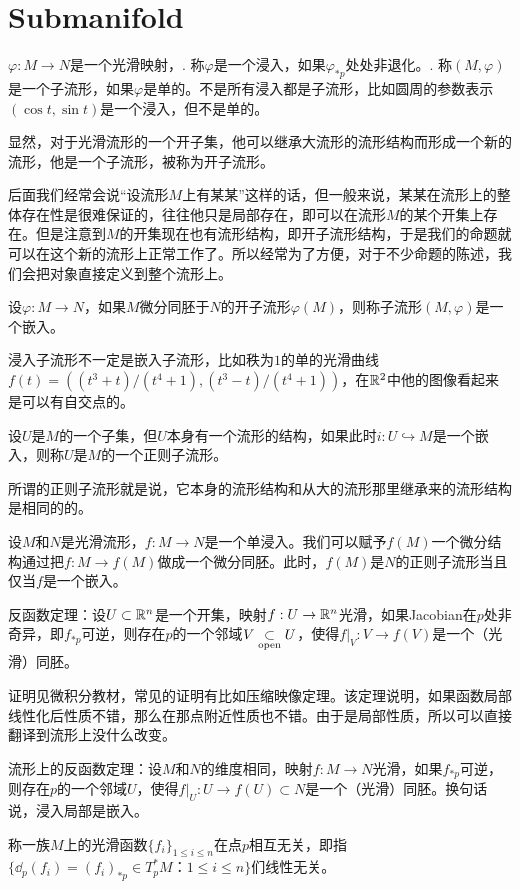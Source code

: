 \section{Submanifold}

\para $\varphi:M\to N$是一个光滑映射，. 称$\varphi$是一个浸入，如果$\varphi_{*p}$处处非退化。. 称$(M,\varphi)$是一个子流形，如果$\varphi$是单的。不是所有浸入都是子流形，比如圆周的参数表示$(\cos t,\sin t)$是一个浸入，但不是单的。

显然，对于光滑流形的一个开子集，他可以继承大流形的流形结构而形成一个新的流形，他是一个子流形，被称为开子流形。

后面我们经常会说“设流形$M$上有某某”这样的话，但一般来说，某某在流形上的整体存在性是很难保证的，往往他只是局部存在，即可以在流形$M$的某个开集上存在。但是注意到$M$的开集现在也有流形结构，即开子流形结构，于是我们的命题就可以在这个新的流形上正常工作了。所以经常为了方便，对于不少命题的陈述，我们会把对象直接定义到整个流形上。

\para 设$\varphi:M\to N$，如果$M$微分同胚于$N$的开子流形$\varphi(M)$，则称子流形$(M,\varphi)$是一个嵌入。

浸入子流形不一定是嵌入子流形，比如秩为$1$的单的光滑曲线$f(t)=((t^3+t)/(t^4+1),(t^3-t)/(t^4+1))$，在$\mathbb{R}^2$中他的图像看起来是可以有自交点的。

\para 设$U$是$M$的一个子集，但$U$本身有一个流形的结构，如果此时$i:U\hookrightarrow M$是一个嵌入，则称$U$是$M$的一个正则子流形。

所谓的正则子流形就是说，它本身的流形结构和从大的流形那里继承来的流形结构是相同的的。

\para 设$M$和$N$是光滑流形，$f:M\to N$是一个单浸入。我们可以赋予$f(M)$一个微分结构通过把$f:M\to f(M)$做成一个微分同胚。此时，$f(M)$是$N$的正则子流形当且仅当$f$是一个嵌入。

\para 反函数定理：设$U\subset \mathbb{R}^n$是一个开集，映射$f:U\to \mathbb{R}^n$光滑，如果Jacobian在$p$处非奇异，即$f_{*p}$可逆，则存在$p$的一个邻域$V\underset{\mathrm{open}}{\subset} U$，使得$f|_V:V\to f(V)$是一个（光滑）同胚。

证明见微积分教材，常见的证明有比如压缩映像定理。该定理说明，如果函数局部线性化后性质不错，那么在那点附近性质也不错。由于是局部性质，所以可以直接翻译到流形上没什么改变。

\theo 流形上的反函数定理：设$M$和$N$的维度相同，映射$f:M\to N$光滑，如果$f_{*p}$可逆，则存在$p$的一个邻域$U$，使得$f|_U:U\to f(U)\subset N$是一个（光滑）同胚。换句话说，浸入局部是嵌入。

\para 称一族$M$上的光滑函数$\{f_i\}_{1\leq i\leq n}$在点$p$相互无关，即指$\{\dd_p (f_i)=(f_i)_{*p}\in T_p^*M：1\leq i\leq n\}$们线性无关。

